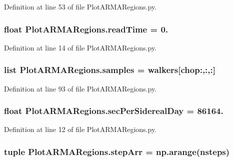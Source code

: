 Definition at line 53 of file Plot\-A\-R\-M\-A\-Regions.\-py.

\hypertarget{namespace_plot_a_r_m_a_regions_a5329612770d2afb1002bfc0672f392d8}{
\subsubsection[{read\-Time}]{\setlength{\rightskip}{0pt plus 5cm}float Plot\-A\-R\-M\-A\-Regions.\-read\-Time = 0.}}\label{namespace_plot_a_r_m_a_regions_a5329612770d2afb1002bfc0672f392d8}


Definition at line 14 of file Plot\-A\-R\-M\-A\-Regions.\-py.

\hypertarget{namespace_plot_a_r_m_a_regions_aa67f172c43ed86ba8625f428144531b0}{
\subsubsection[{samples}]{\setlength{\rightskip}{0pt plus 5cm}list Plot\-A\-R\-M\-A\-Regions.\-samples = {\bf walkers}\mbox{[}chop\-:,\-:,\-:\mbox{]}}}\label{namespace_plot_a_r_m_a_regions_aa67f172c43ed86ba8625f428144531b0}


Definition at line 93 of file Plot\-A\-R\-M\-A\-Regions.\-py.

\hypertarget{namespace_plot_a_r_m_a_regions_a911f440b0b304e72e7588c7508cacd20}{
\subsubsection[{sec\-Per\-Sidereal\-Day}]{\setlength{\rightskip}{0pt plus 5cm}float Plot\-A\-R\-M\-A\-Regions.\-sec\-Per\-Sidereal\-Day = 86164.}}\label{namespace_plot_a_r_m_a_regions_a911f440b0b304e72e7588c7508cacd20}


Definition at line 12 of file Plot\-A\-R\-M\-A\-Regions.\-py.

\hypertarget{namespace_plot_a_r_m_a_regions_aeab291d1791e6713eb80e5d400f942f5}{
\subsubsection[{step\-Arr}]{\setlength{\rightskip}{0pt plus 5cm}tuple Plot\-A\-R\-M\-A\-Regions.\-step\-Arr = np.\-arange({\bf nsteps})}}\label{namespace_plot_a_r_m_a_regions_aeab291d1791e6713eb80e5d400f942f5}


